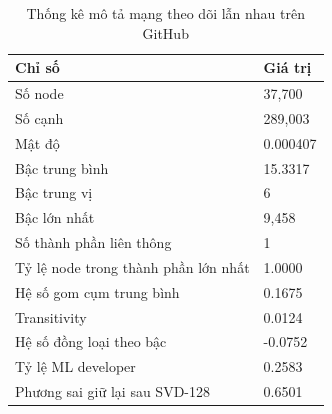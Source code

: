 \begin{table}[htbp]
\caption{Thống kê mô tả mạng theo dõi lẫn nhau trên GitHub}
\label{tab:network_stats}
\begin{tabular}{ll}
\toprule
Chỉ số & Giá trị \\
\midrule
Số node & 37,700 \\
Số cạnh & 289,003 \\
Mật độ & 0.000407 \\
Bậc trung bình & 15.3317 \\
Bậc trung vị & 6 \\
Bậc lớn nhất & 9,458 \\
Số thành phần liên thông & 1 \\
Tỷ lệ node trong thành phần lớn nhất & 1.0000 \\
Hệ số gom cụm trung bình & 0.1675 \\
Transitivity & 0.0124 \\
Hệ số đồng loại theo bậc & -0.0752 \\
Tỷ lệ ML developer & 0.2583 \\
Phương sai giữ lại sau SVD-128 & 0.6501 \\
\bottomrule
\end{tabular}
\end{table}
